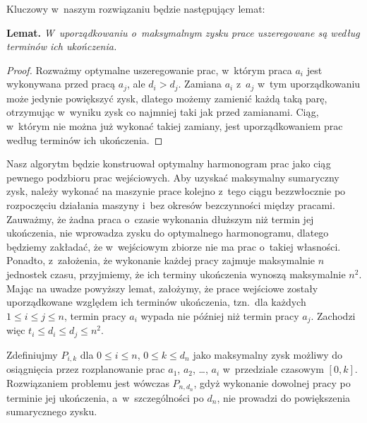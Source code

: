 Kluczowy w~naszym rozwiązaniu będzie następujący lemat:

\medskip
\noindent\textsf{\textbf{Lemat.}} \textit{W~uporządkowaniu o~maksymalnym zysku prace uszeregowane są według terminów ich ukończenia.}
\begin{proof}
Rozważmy optymalne uszeregowanie prac, w~którym praca $a_i$ jest wykonywana przed pracą $a_j$, ale $d_i>d_j$.
Zamiana $a_i$ z~$a_j$ w~tym uporządkowaniu może jedynie powiększyć zysk, dlatego możemy zamienić każdą taką parę, otrzymując w~wyniku zysk co najmniej taki jak przed zamianami.
Ciąg, w~którym nie można już wykonać takiej zamiany, jest uporządkowaniem prac według terminów ich ukończenia.
\end{proof}

Nasz algorytm będzie konstruował optymalny harmonogram prac jako ciąg pewnego podzbioru prac wejściowych.
Aby uzyskać maksymalny sumaryczny zysk, należy wykonać na maszynie prace kolejno z~tego ciągu bezzwłocznie po rozpoczęciu działania maszyny i~bez okresów bezczynności między pracami.
Zauważmy, że żadna praca o~czasie wykonania dłuższym niż termin jej ukończenia, nie wprowadza zysku do optymalnego harmonogramu, dlatego będziemy zakładać, że w~wejściowym zbiorze nie ma prac o~takiej własności.
Ponadto, z~założenia, że wykonanie każdej pracy zajmuje maksymalnie $n$ jednostek czasu, przyjmiemy, że ich terminy ukończenia wynoszą maksymalnie $n^2$.
Mając na uwadze powyższy lemat, założymy, że prace wejściowe zostały uporządkowane względem ich terminów ukończenia, tzn.\ dla każdych $1\le i\le j\le n$, termin pracy $a_i$ wypada nie później niż termin pracy $a_j$.
Zachodzi więc $t_i\le d_i\le d_j\le n^2$.

Zdefiniujmy $P_{i,k}$ dla $0\le i\le n$, $0\le k\le d_n$ jako maksymalny zysk możliwy do osiągnięcia przez rozplanowanie prac $a_1$, $a_2$, \dots, $a_i$ w~przedziale czasowym $[0,k]$.
Rozwiązaniem problemu jest wówczas $P_{n,d_n}$\!, gdyż wykonanie dowolnej pracy po terminie jej ukończenia, a~w~szczególności po $d_n$, nie prowadzi do powiększenia sumarycznego zysku.

